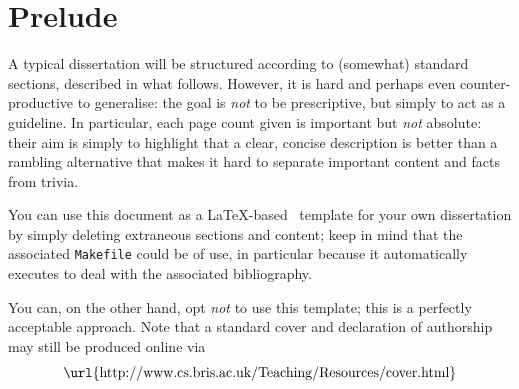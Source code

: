 \documentclass[ %
                    author={Callum Pearce},
                supervisor={Dr. Neill Campbell},
                    degree={MEng},
                     title={How effective are Temporal difference learning methods for reducing the number of zero contribution light paths while still accurately approximating Global Illumination in Path tracing?},
                  subtitle={},
                      type={research},
                      year={2019} ]{dissertation}
\begin{document}


\section*{Prelude}
\thispagestyle{empty}

A typical dissertation will be structured according to (somewhat) standard 
sections, described in what follows.  However, it is hard and perhaps even 
counter-productive to generalise: the goal is {\em not} to be prescriptive, 
but simply to act as a guideline.  In particular, each page count given is
important but {\em not} absolute: their aim is simply to highlight that a 
clear, concise description is better than a rambling alternative that makes
it hard to separate important content and facts from trivia.

You can use this document as a \LaTeX-based~\cite{latexbook1,latexbook2} 
template for your own dissertation by simply deleting extraneous sections
and content; keep in mind that the associated {\tt Makefile} could be of
use, in particular because it automatically executes  to 
deal with the associated bibliography.  

You can, on the other hand, opt {\em not} to use this template; this is a 
perfectly acceptable approach.  Note that a standard cover and declaration 
of authorship may still be produced online via
\[
\mbox{\url{http://www.cs.bris.ac.uk/Teaching/Resources/cover.html}}
\]



\maketitle

\end{document}
